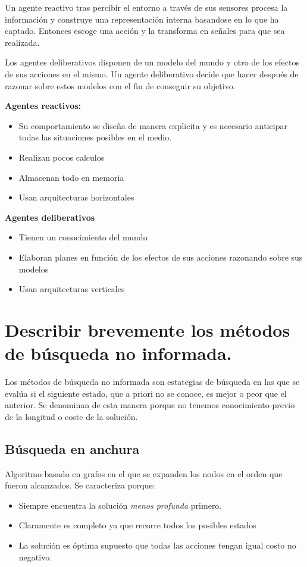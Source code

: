 \documentclass[12pt]{article}
\begin{document}
Un agente reactivo tras percibir el entorno a través de sus sensores
procesa la información y construye una representación interna
basandose en lo que ha captado. Entonces escoge una acción y la
transforma en señales para que sea realizada.

Los agentes deliberativos disponen de un modelo del mundo y otro de
los efectos de sus acciones en el mismo. Un agente deliberativo decide
que hacer después de razonar sobre estos modelos con el fin de
conseguir su objetivo.

\textbf{Agentes reactivos:}
\begin{itemize}
\item Su comportamiento se diseña de manera explicita y es necesario
  anticipar todas las situaciones posibles en el medio.
\item Realizan pocos calculos
\item Almacenan todo en memoria
\item Usan arquitecturas horizontales
\end{itemize}

\textbf{Agentes deliberativos}
\begin{itemize}
\item Tienen un conocimiento del mundo
\item Elaboran planes en función de los efectos de sus acciones razonando sobre sus modelos
\item Usan arquitecturas verticales
\end{itemize}


\section{Describir brevemente los métodos de búsqueda no informada.}

Los métodos de búsqueda no informada son estategias de búsqueda en las
que se evalúa si el siguiente estado, que a priori no se conoce, es
mejor o peor que el anterior. Se denominan de esta manera porque no
tenemos conocimiento previo de la longitud o coste de la solución.

\subsection{Búsqueda en anchura}

Algoritmo basado en grafos en el que se expanden los nodos en el orden
que fueron alcanzados. Se caracteriza porque:

\begin{itemize}
\item Siempre encuentra la solución \textit{menos profunda} primero.
\item Claramente es completo ya que recorre todos los posibles estados
\item La solución es óptima supuesto que todas las acciones tengan
  igual costo no negativo.
\end{itemize}
\end{document}
